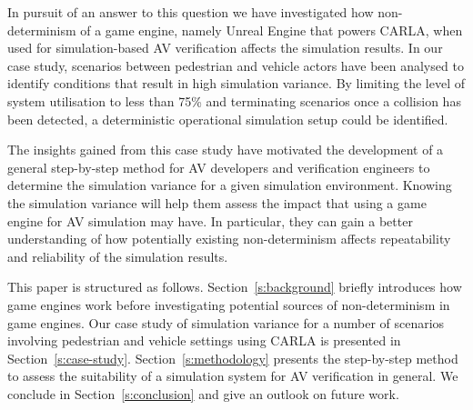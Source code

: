 \documentclass[letterpaper, 10 pt, journal, twoside]{IEEEtran}
\begin{document}
In pursuit of an answer to this question we have investigated how non-determinism of a game engine, namely Unreal Engine that powers CARLA, when used for simulation-based AV verification affects the simulation results. 
%
In our case study, scenarios between pedestrian and vehicle actors have been analysed to identify conditions that result in high simulation variance.
%
By limiting the level of system utilisation to less than 75\% and terminating scenarios once a collision has been detected, a deterministic operational simulation setup could be identified.

The insights gained from this case study have motivated the development of a general step-by-step method for AV developers and verification engineers to determine the simulation variance for a given simulation environment. 
%
Knowing the simulation variance will help them assess the impact that using a game engine for AV simulation may have. In particular, they can gain a better understanding of how potentially existing non-determinism affects repeatability and reliability of the simulation results. 
%
%
%

This paper is structured as follows.
%
Section~\ref{s:background} briefly introduces how game engines work before investigating potential sources of non-determinism in game engines.
%
Our case study of simulation variance for a number of scenarios involving pedestrian and vehicle settings using CARLA is presented in Section~\ref{s:case-study}.
%
Section~\ref{s:methodology} presents the step-by-step method to assess the suitability of a simulation system for AV verification in general. 
%
We conclude in Section~\ref{s:conclusion} and give an outlook on future work.


\end{document}
